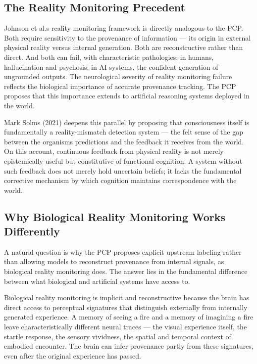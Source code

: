 \documentclass[12pt]{article}
\begin{document}
\subsection{The Reality Monitoring Precedent}\label{the-reality-monitoring-precedent}

Johnson et al.\textquotesingle s reality monitoring framework is
directly analogous to the PCP. Both require sensitivity to the
provenance of information --- its origin in external physical reality
versus internal generation. Both are reconstructive rather than direct.
And both can fail, with characteristic pathologies: in humans,
hallucination and psychosis; in AI systems, the confident generation of
ungrounded outputs. The neurological severity of reality monitoring
failure reflects the biological importance of accurate provenance
tracking. The PCP proposes that this importance extends to artificial
reasoning systems deployed in the world.

Mark Solms (2021) deepens this parallel by proposing that consciousness
itself is fundamentally a reality-mismatch detection system --- the felt
sense of the gap between the organism\textquotesingle s predictions and
the feedback it receives from the world. On this account, continuous
feedback from physical reality is not merely epistemically useful but
constitutive of functional cognition. A system without such feedback
does not merely hold uncertain beliefs; it lacks the fundamental
corrective mechanism by which cognition maintains correspondence with
the world.

\subsection{Why Biological Reality Monitoring Works Differently}\label{why-biological-reality-monitoring-works-differently}

A natural question is why the PCP proposes explicit upstream labeling
rather than allowing models to reconstruct provenance from internal
signals, as biological reality monitoring does. The answer lies in the
fundamental difference between what biological and artificial systems
have access to.

Biological reality monitoring is implicit and reconstructive because the
brain has direct access to perceptual signatures that distinguish
externally from internally generated experience. A memory of seeing a
fire and a memory of imagining a fire leave characteristically different
neural traces --- the visual experience itself, the startle response,
the sensory vividness, the spatial and temporal context of embodied
encounter. The brain can infer provenance partly from these signatures,
even after the original experience has passed.
\end{document}
